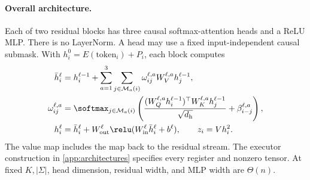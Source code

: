 \paragraph{Overall architecture.}\label{ass:arch}
Each of two residual blocks has three causal softmax-attention heads and a ReLU MLP. There is no LayerNorm. A head may use a fixed input-independent causal submask. With $h_i^0=E(\mathrm{token}_i)+P_i$, each block computes
\begin{align}
\bar h_i^\ell&=h_i^{\ell-1}+\sum_{a=1}^3\sum_{j\in\mathcal M_a(i)}\omega_{ij}^{\ell,a} W_V^{\ell,a}h_j^{\ell-1},\nonumber\\
\omega_{ij}^{\ell,a}&=\softmax_{j\in\mathcal M_a(i)}\left(\frac{(W_Q^{\ell,a}h_i^{\ell-1})^\top W_K^{\ell,a}h_j^{\ell-1}}{\sqrt{d_{\mathrm h}}}+\beta_{i-j}^{\ell,a}\right),\label{eq:block}\\
h_i^\ell&=\bar h_i^\ell+W_{\mathrm{out}}^\ell\relu(W_{\mathrm{in}}^\ell\bar h_i^\ell+b^\ell),\qquad z_i=Vh_i^2.\nonumber
\end{align}
The value map includes the map back to the residual stream. The executor construction in \cref{app:architectures} specifies every register and nonzero tensor. At fixed $K,|\Sigma|$, head dimension, residual width, and MLP width are $\Theta(n)$.

